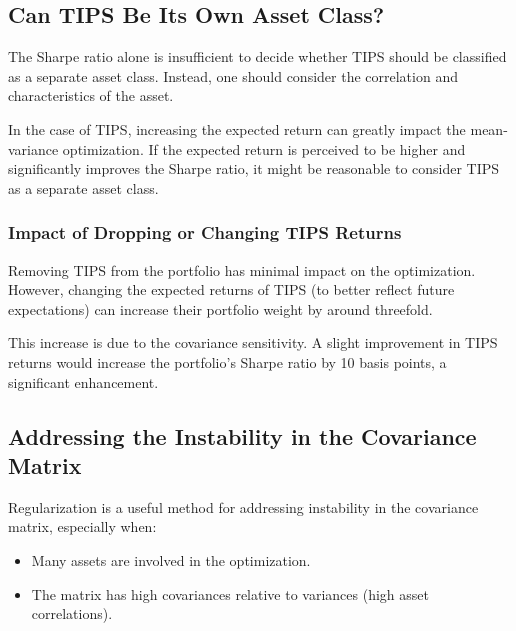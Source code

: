 \documentclass{article}
\begin{document}
\hypertarget{can-tips-be-its-own-asset-class}{%
\subsection{Can TIPS Be Its Own Asset
Class?}\label{can-tips-be-its-own-asset-class}}

The Sharpe ratio alone is insufficient to decide whether TIPS should be
classified as a separate asset class. Instead, one should consider the
correlation and characteristics of the asset.

In the case of TIPS, increasing the expected return can greatly impact
the mean-variance optimization. If the expected return is perceived to
be higher and significantly improves the Sharpe ratio, it might be
reasonable to consider TIPS as a separate asset class.

\hypertarget{impact-of-dropping-or-changing-tips-returns}{%
\subsubsection{Impact of Dropping or Changing TIPS
Returns}\label{impact-of-dropping-or-changing-tips-returns}}

Removing TIPS from the portfolio has minimal impact on the optimization.
However, changing the expected returns of TIPS (to better reflect future
expectations) can increase their portfolio weight by around threefold.

This increase is due to the covariance sensitivity. A slight improvement
in TIPS returns would increase the portfolio's Sharpe ratio by 10 basis
points, a significant enhancement.

\hypertarget{addressing-the-instability-in-the-covariance-matrix}{%
\subsection{Addressing the Instability in the Covariance
Matrix}\label{addressing-the-instability-in-the-covariance-matrix}}

Regularization is a useful method for addressing instability in the
covariance matrix, especially when: 
\begin{itemize}
    \item Many assets are involved in the
    optimization.
    \item The matrix has high covariances relative to variances
    (high asset correlations).
\end{itemize}
\end{document}
